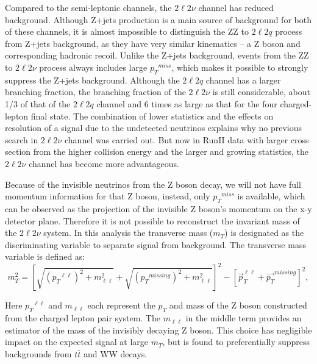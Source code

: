 \vspace{0.3cm}
Compared to the semi-leptonic channels, the $2\ell 2\nu$ channel has reduced background. Although Z+jets production is a main source of background for both of these channels, it is almost impossible to distinguish the ZZ to $2\ell 2q$ process from Z+jets background, as they have very similar kinematics -- a Z boson and corresponding hadronic recoil. Unlike the Z+jets background, events from the ZZ to $2\ell 2\nu$ process always includes large ${p_{T}}^{miss}$, which makes it possible to strongly suppress the Z+jets background. Although the $2\ell 2q$ channel has a larger branching fraction, the branching fraction of the $2\ell 2\nu$ is still considerable, about 1/3 of that of the $2\ell 2q$ channel and 6 times as large as that for the four charged-lepton final state. The combination of lower statistics and the effects on resolution of a signal due to the undetected neutrinos explains why no previous search in $2\ell 2\nu$ channel was carried out. But now in RunII data with larger cross section from the higher collision energy and the larger and growing statistics, the $2\ell 2\nu$ channel has become more advantageous.

\vspace{0.3cm}
Because of the invisible neutrinos from the Z boson decay, we will not have full momentum information for that Z boson, instead, only ${p_{T}}^{miss}$ is available, which can be observed as the projection of the invisible Z boson's momentum on the x-y detector plane. Therefore it is not possible to reconstruct the invariant mass of the $2\ell 2\nu$ system. In this analysis the transverse mass ($m_{T}$) is designated as the discriminating variable to separate signal from background. The transverse mass variable is defined as:
\begin{equation}
m_{T}^2 = \left[ \sqrt{({p_{T}}^{\ell\ell})^2 + m^2_{\ell\ell}}
      + \sqrt{({p_{T}}^{missing})^2+m^2_{\ell\ell}}\right]^2
      - \left[\vec{p}_{T}^{\ell\ell}+\vec{p_{T}}^{missing}\right]^2,
\label{eqn:intro_MT}
\end{equation}

Here ${p_{T}}^{\ell\ell}$ and $m_{\ell\ell}$ each represent the $p_{T}$ and mass of the Z boson constructed from the charged lepton pair system. The $m_{\ell\ell}$ in the middle term provides an estimator of the mass of the invisibly decaying Z boson. This choice has negligible impact on the expected signal at large $m_{T}$, but is found to preferentially suppress backgrounds from $t\bar{t}$ and WW decays.

